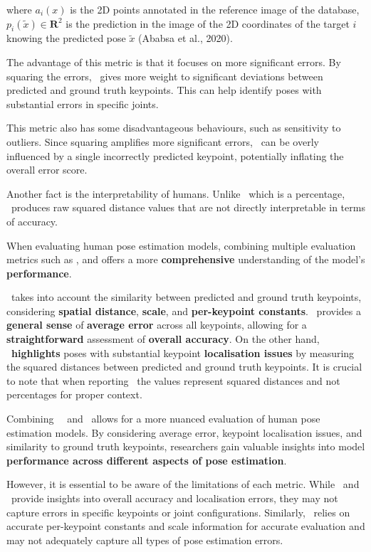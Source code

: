where $ a_i (x) $ is the 2D points annotated in the reference image of the database, $ p_i (\tilde{x}) \in \mathbf R^2 $ is the prediction in the image of the 2D coordinates of the target $ i $ knowing the predicted pose $ \tilde{x} $ (\scc Ababsa et al., 2020).

The advantage of this metric is that it focuses on more significant errors. By squaring the errors, \MSE\ gives more weight to significant deviations between predicted and ground truth keypoints. This can help identify poses with substantial errors in specific joints.

This metric also has some disadvantageous behaviours, such as sensitivity to outliers. Since squaring amplifies more significant errors, \MSE\ can be overly influenced by a single incorrectly predicted keypoint, potentially inflating the overall error score.

Another fact is the interpretability of humans. Unlike \APE\, which is a percentage, \MSE\ produces raw squared distance values that are not directly interpretable in terms of accuracy.


When evaluating human pose estimation models, combining multiple evaluation metrics such as {\bf \OKS}, {\bf \APE} and {\bf \MSE} offers a more {\bf comprehensive} understanding of the model's {\bf performance}.

\OKS\ takes into account the similarity between predicted and ground truth keypoints, considering {\bf spatial distance}, {\bf scale}, and {\bf per-keypoint constants}. \APE\ provides a {\bf general sense} of {\bf average error} across all keypoints, allowing for a {\bf straightforward} assessment of {\bf overall accuracy}. On the other hand, \MSE\ {\bf highlights} poses with substantial keypoint {\bf localisation issues} by measuring the squared distances between predicted and ground truth keypoints. It is crucial to note that when reporting \MSE\, the values represent squared distances and not percentages for proper context.

Combining \OKS\, \APE\ and \MSE\ allows for a more nuanced evaluation of human pose estimation models. By considering average error, keypoint localisation issues, and similarity to ground truth keypoints, researchers gain valuable insights into model {\bf performance across different aspects of pose estimation}.

However, it is essential to be aware of the limitations of each metric. While \APE\ and \MSE\ provide insights into overall accuracy and localisation errors, they may not capture errors in specific keypoints or joint configurations. Similarly, \OKS\ relies on accurate per-keypoint constants and scale information for accurate evaluation and may not adequately capture all types of pose estimation errors.

